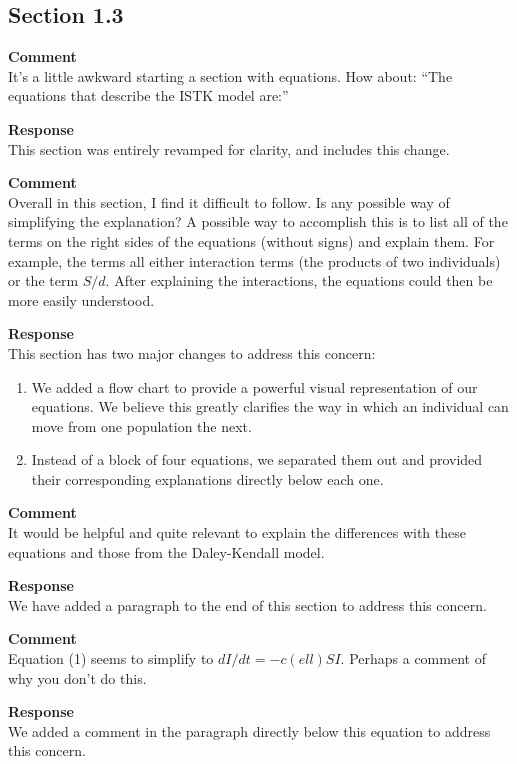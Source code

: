 \subsection{Section 1.3}
\setcounter{rev2-1.3}{1}

\textbf{Comment } \\
It’s a little awkward starting a section with equations. How about: ``The equations that describe the ISTK model are:''

\textbf{Response } \\
This section was entirely revamped for clarity, and includes this change.

\textbf{Comment } \\
Overall in this section, I find it difficult to follow.
Is any possible way of simplifying the explanation?
A possible way to accomplish this is to list all of the terms on the right sides of the equations (without signs) and explain them.
For example, the terms all either interaction terms (the products of two individuals) or the term $ S/d $.
After explaining the interactions, the equations could then be more easily understood.

\textbf{Response } \\
This section has two major changes to address this concern:
\begin{enumerate}
    \item We added a flow chart to provide a powerful visual representation of our equations.
    We believe this greatly clarifies the way in which an individual can move from one population the next.
    \item Instead of a block of four equations, we separated them out and provided their corresponding explanations directly below each one.
\end{enumerate}

\textbf{Comment } \\
It would be helpful and quite relevant to explain the differences with these equations and those from the Daley-Kendall model.

\textbf{Response } \\
We have added a paragraph to the end of this section to address this concern.

\textbf{Comment } \\
Equation (1) seems to simplify to $ dI/dt = -c(ell) S I $.
Perhaps a comment of why you don't do this.

\textbf{Response } \\
We added a comment in the paragraph directly below this equation to address this concern.

